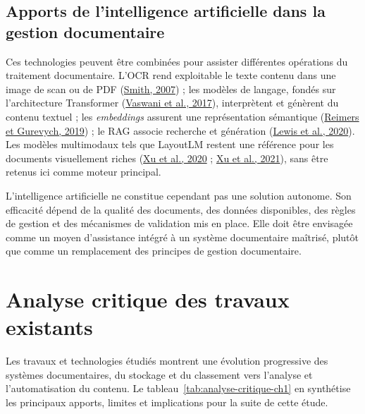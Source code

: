 \documentclass[12pt,a4paper]{report}
\newcommand{\citer}[2]{\hyperref[ref:#1]{#2}}
\begin{document}
\subsection{Apports de l'intelligence artificielle dans la gestion documentaire}
Ces technologies peuvent être combinées pour assister différentes opérations du traitement documentaire. L'OCR rend exploitable le texte contenu dans une image de scan ou de PDF (\citer{smith2007}{Smith, 2007}) ; les modèles de langage, fondés sur l'architecture Transformer (\citer{vaswani2017}{Vaswani et al., 2017}), interprètent et génèrent du contenu textuel ; les \textit{embeddings} assurent une représentation sémantique (\citer{reimers2019}{Reimers et Gurevych, 2019}) ; le RAG associe recherche et génération (\citer{lewis2020}{Lewis et al., 2020}). Les modèles multimodaux tels que LayoutLM restent une référence pour les documents visuellement riches (\citer{xu2020}{Xu et al., 2020} ; \citer{xu2021}{Xu et al., 2021}), sans être retenus ici comme moteur principal.

L'intelligence artificielle ne constitue cependant pas une solution autonome. Son efficacité dépend de la qualité des documents, des données disponibles, des règles de gestion et des mécanismes de validation mis en place. Elle doit être envisagée comme un moyen d'assistance intégré à un système documentaire maîtrisé, plutôt que comme un remplacement des principes de gestion documentaire.

\section{Analyse critique des travaux existants}
Les travaux et technologies étudiés montrent une évolution progressive des systèmes documentaires, du stockage et du classement vers l'analyse et l'automatisation du contenu. Le tableau~\ref{tab:analyse-critique-ch1} en synthétise les principaux apports, limites et implications pour la suite de cette étude.
\end{document}
